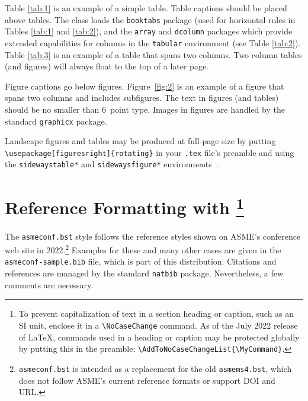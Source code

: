 \documentclass[captionpatch,colorlinks,upint,subscriptcorrection,varvw,german]{asmeconf}
\begin{document}
Table \ref{tab:1} is an example of a simple table. Table captions should be placed above tables.
The class loads the \texttt{booktabs} package (used for horizontal rules in Tables \ref{tab:1} and \ref{tab:2}), and the \texttt{array} and \texttt{dcolumn} packages which provide extended capabilities for columns in the \texttt{tabular} environment (see Table \ref{tab:2}).  Table \ref{tab:3} is an example of a table that spans two columns. Two column tables (and figures) will always float to the top of a later page.

Figure captions go below figures. Figure~\ref{fig:2} is an example of a figure that spans two columns and includes subfigures. The text in figures (and tables) should be no smaller than 6~point type. Images in figures are handled by the standard \texttt{graphicx} package.

Landscape figures and tables may be produced at full-page size by putting \verb|\usepackage[figuresright]{rotating}| in your \texttt{.tex} file's preamble and using the \texttt{sidewaystable*} and \texttt{sidewaysfigure*} environments~\cite{fairbairns}.



\section{Reference Formatting with \footnote{To prevent capitalization of text in a section heading or caption, such as an SI unit, enclose it in a \texttt{\textbackslash NoCaseChange} command. As of the July 2022 release of \LaTeX, commands used in a heading or caption may be protected globally by putting this in the preamble: \texttt{\textbackslash AddToNoCaseChangeList\{\textbackslash MyCommand\}}.}}\label{sec:references}

The {\upshape\texttt{asmeconf.bst}}   style follows the reference styles shown on ASME's conference web site in  2022.\footnote{\texttt{asmeconf.bst} is intended as a replacement for the old \texttt{asmems4.bst}, which does not follow ASME's current reference formats or support DOI and URL.}
Examples for these and many other cases are given in the \texttt{asmeconf-sample.bib} file, which is part of this distribution. Citations and references are managed by the standard \texttt{natbib} package.  Nevertheless, a few comments are necessary. 

\end{document}
